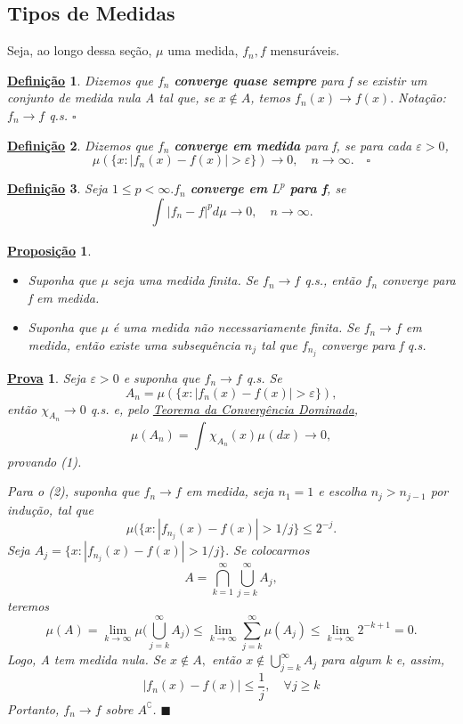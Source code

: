 \documentclass{article}
\newtheorem*{def*}{\underline{Defini\c c\~ao}}
\newtheorem*{prop*}{\underline{Proposi\c c\~ao}}
\newtheorem*{proof*}{\underline{Prova}}
\renewcommand\qedsymbol{$\blacksquare$}
\begin{document}
\subsection{Tipos de Medidas}
  Seja, ao longo dessa seção, \(\mu \) uma medida, \(f_{n}, f\) mensuráveis. 
 \begin{def*}
   Dizemos que \(f_{n}\) \textbf{converge quase sempre} para f se existir um conjunto de medida nula A tal que, se \(x\not\in A\), temos \(f_{n}(x)\to f(x).\) Notação: \(f_{n}\to f\) q.s. \(\square\)
 \end{def*}
 \begin{def*}
   Dizemos que \(f_{n}\) \textbf{converge em medida} para f, se para cada \(\varepsilon  > 0\),
     \[
       \mu (\{x: |f_{n}(x) - f(x)| > \varepsilon \})\to 0,\quad n\to \infty.\quad \square 
     \]
 \end{def*}
 \begin{def*}
   Seja \(1\leq p < \infty. f_{n}\)\textbf{ converge em }\(L^{p}\)\textbf{ para f}, se 
     \[
       \int_{}|f_{n} - f|^{p} d\mu\to 0,\quad n\to \infty.
     \]
 \end{def*}
\begin{prop*}
  \begin{itemize}
    \item[i)]Suponha que \(\mu \) seja uma medida finita. Se \(f_{n}\to f\) q.s., então \(f_{n}\) converge para f em medida.
    \item[ii)] Suponha que \(\mu \) é uma medida não necessariamente finita. Se \(f_{n}\to f\) em medida, então existe uma subsequência \(n_{j}\) tal que \(f_{n_{j}}\) converge para f q.s.
  \end{itemize}
\end{prop*}
\begin{proof*}
  Seja \(\varepsilon > 0\) e suponha que \(f_{n}\to f\) q.s. Se 
    \[
      A_{n} = \mu (\{x: |f_{n}(x) - f(x)| > \varepsilon \}),
    \]
  então \(\chi_{A_{n}}\to 0\) q.s. e, pelo \hyperlink{dominated_convergence}{\textit{Teorema da Convergência Dominada}}, 
    \[
      \mu (A_{n}) = \int_{}\chi_{A_{n}}(x) \mu_{}(dx)\to 0,
    \]
  provando (1).

  Para o (2), suponha que \(f_{n}\to f\) em medida, seja \(n_1 = 1\) e escolha \(n_{j} > n_{j-1}\) por indução, tal que 
    \[
      \mu (\{x: |f_{n_{j}}(x) - f(x)| > 1/j\} \leq 2^{-j}.
    \]
  Seja \(A_{j} = \{x: |f_{n_{j}}(x) - f(x)| > 1/j\}.\) Se colocarmos 
    \[
      A = \bigcap_{k=1}^{\infty}\bigcup_{j=k}^{\infty}A_{j},
    \]
  teremos 
    \[
      \mu (A) = \lim_{k\to \infty}\mu \biggl(\bigcup_{j=k}^{\infty}A_{j}\biggr) \leq \lim_{k\to \infty}\sum\limits_{j=k}^{\infty}\mu (A_{j}) \leq \lim_{k\to \infty}2^{-k+1} = 0.
    \]
  Logo, A tem medida nula. Se \(x\not\in A,\) então \(x\not\in \bigcup_{j=k}^{\infty}A_{j}\) para algum k e, assim, 
    \[
      |f_{n}(x)-f(x)|\leq \frac{1}{j},\quad \forall j\geq k
    \]
  Portanto, \(f_{n}\to f\) sobre \(A ^{\complement}\). \qedsymbol
\end{proof*}
\end{document}
